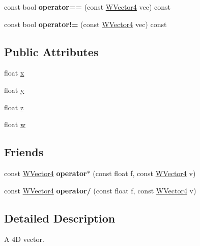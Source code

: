 \begin{DoxyCompactItemize}
\item 
const bool {\bfseries operator==} (const \hyperlink{class_w_vector4}{W\+Vector4} vec) const \hypertarget{class_w_vector4_a187fb61bf5664c7c1f09e4c0e1c83285}{}\label{class_w_vector4_a187fb61bf5664c7c1f09e4c0e1c83285}

\item 
const bool {\bfseries operator!=} (const \hyperlink{class_w_vector4}{W\+Vector4} vec) const \hypertarget{class_w_vector4_ab6b1724e3dad14bce550d2e732ee09dd}{}\label{class_w_vector4_ab6b1724e3dad14bce550d2e732ee09dd}

\end{DoxyCompactItemize}
\subsection*{Public Attributes}
\begin{DoxyCompactItemize}
\item 
float \hyperlink{class_w_vector4_a855b484722da51ff1ecdab2524f194df}{x}
\item 
float \hyperlink{class_w_vector4_a22ff2849429e14a11ce1d4aeffd47eeb}{y}
\item 
float \hyperlink{class_w_vector4_ac3ec3a5457109c11558dc4fbebb072b4}{z}
\item 
float \hyperlink{class_w_vector4_a05c1aefe5406d5e72298452f7ca4c1b8}{w}
\end{DoxyCompactItemize}
\subsection*{Friends}
\begin{DoxyCompactItemize}
\item 
const \hyperlink{class_w_vector4}{W\+Vector4} {\bfseries operator$\ast$} (const float f, const \hyperlink{class_w_vector4}{W\+Vector4} v)\hypertarget{class_w_vector4_af66e61e28ef06c5e39b6609daf512cd5}{}\label{class_w_vector4_af66e61e28ef06c5e39b6609daf512cd5}

\item 
const \hyperlink{class_w_vector4}{W\+Vector4} {\bfseries operator/} (const float f, const \hyperlink{class_w_vector4}{W\+Vector4} v)\hypertarget{class_w_vector4_a76804aaf1c04c04b1bef46e7daf26fe9}{}\label{class_w_vector4_a76804aaf1c04c04b1bef46e7daf26fe9}

\end{DoxyCompactItemize}


\subsection{Detailed Description}
A 4D vector. 

